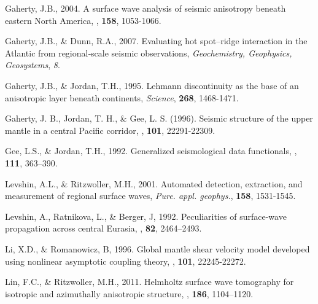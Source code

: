 \documentclass[referee]{gji}
\begin{document}
{{\begin{thebibliography}{}
	   Gaherty, J.B., 2004. A surface wave analysis of seismic anisotropy beneath eastern North America, \textbf{\gji}, \textbf{158}, 1053-1066.

	   Gaherty, J.B., \& Dunn, R.A., 2007. Evaluating hot spot–ridge interaction in the Atlantic from regional‐scale seismic observations, \textit{Geochemistry, Geophysics, Geosystems}, \textit{8}.

	   Gaherty, J.B., \& Jordan, T.H., 1995. Lehmann discontinuity as the base of an anisotropic layer beneath continents, \textit{Science}, \textbf{268}, 1468-1471.

	   Gaherty, J. B., Jordan, T. H., \& Gee, L. S. (1996). Seismic structure of the upper mantle in a central Pacific corridor, \textit{\jgr}, \textbf{101}, 22291-22309.

	   Gee, L.S., \& Jordan, T.H., 1992. Generalized seismological data functionals, \textit{\gji}, \textbf{111}, 363–390.


	   Levshin, A.L., \& Ritzwoller, M.H., 2001. Automated detection, extraction, and measurement of regional surface waves, \textit{Pure. appl. geophys.}, \textbf{158}, 1531-1545.

	   Levshin, A., Ratnikova, L., \& Berger, J, 1992. Peculiarities of surface-wave propagation across central Eurasia, \textit{\bssa}, \textbf{82}, 2464–2493.

	   Li, X.D., \& Romanowicz, B, 1996. Global mantle shear velocity model developed using nonlinear asymptotic coupling theory, \textit{\jgr}, \textbf{101}, 22245-22272.

	   Lin, F.C., \& Ritzwoller, M.H., 2011. Helmholtz surface wave tomography for isotropic and azimuthally anisotropic structure, \textit{\gji}, \textbf{186}, 1104–1120.


\end{thebibliography}}}
\end{document}
